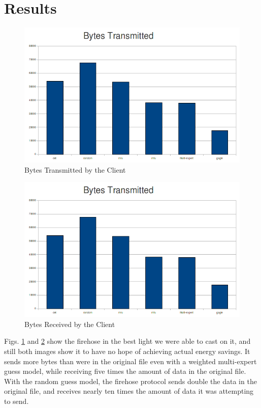 \documentclass[conference]{IEEEtran}
\begin{document}
\section{Results}

\begin{figure}[!t]
\centering
\includegraphics[scale=0.5]{images/firehose_tx.png}
\caption{Bytes Transmitted by the Client}
\label{fig:tx}
\end{figure}

\begin{figure}[!t]
\centering
\includegraphics[scale=0.5]{images/firehose_tx.png}
\caption{Bytes Received by the Client}
\label{fig:rx}
\end{figure}

Figs. \ref{fig:tx} and \ref{fig:rx} show the firehose in the best light we were
able to cast on it, and still both images show it to have no hope of achieving
actual energy savings.  It sends more bytes than were in the original file 
even with a weighted multi-expert guess model, while receiving five times
the amount of data in the original file.  With the random guess model, the
firehose protocol sends double the data in the original file, and receives
nearly ten times the amount of data it was attempting to send.
\end{document}
